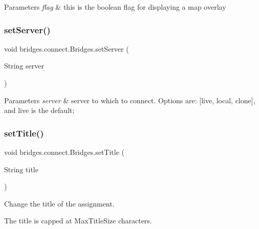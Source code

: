\begin{DoxyParams}{Parameters}
{\em flag} & this is the boolean flag for displaying a map overlay \\
\hline
\end{DoxyParams}
\mbox{\label{classbridges_1_1connect_1_1_bridges_ab43e412448e1dfc340e58c407519a576}} 
\subsubsection{\texorpdfstring{set\+Server()}{setServer()}}
{\footnotesize\ttfamily void bridges.\+connect.\+Bridges.\+set\+Server (\begin{DoxyParamCaption}\item[{String}]{server }\end{DoxyParamCaption})}


\begin{DoxyParams}{Parameters}
{\em server} & server to which to connect. Options are\+: \mbox{[}\textquotesingle{}live\textquotesingle{}, \textquotesingle{}local\textquotesingle{}, \textquotesingle{}clone\textquotesingle{}\mbox{]}, and \textquotesingle{}live\textquotesingle{} is the default; \\
\hline
\end{DoxyParams}
\mbox{\label{classbridges_1_1connect_1_1_bridges_aed3752ee6318a48dff271d9a9e2a8fcc}} 
\subsubsection{\texorpdfstring{set\+Title()}{setTitle()}}
{\footnotesize\ttfamily void bridges.\+connect.\+Bridges.\+set\+Title (\begin{DoxyParamCaption}\item[{String}]{title }\end{DoxyParamCaption})}



Change the title of the assignment. 

The title is capped at Max\+Title\+Size characters.


